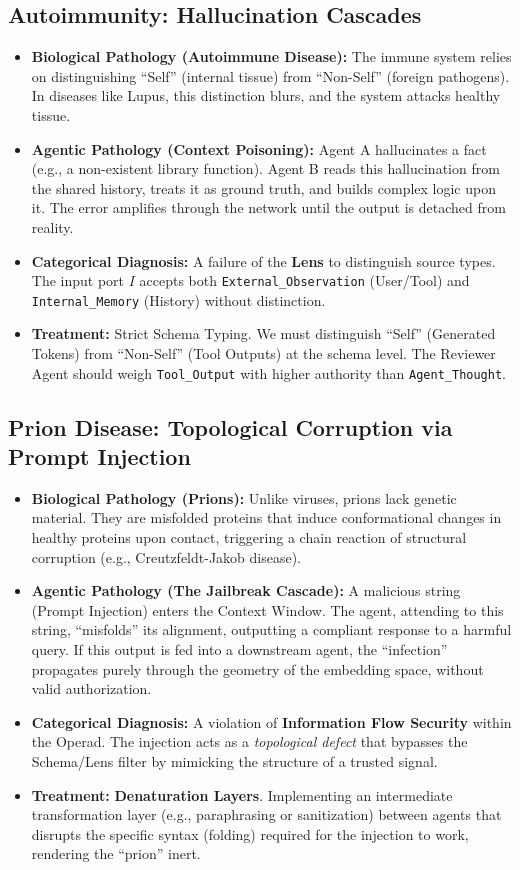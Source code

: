 \documentclass[11pt, a4paper]{article}
\begin{document}
\subsection{Autoimmunity: Hallucination Cascades}
\begin{itemize}
    \item \textbf{Biological Pathology (Autoimmune Disease):} The immune system relies on distinguishing ``Self'' (internal tissue) from ``Non-Self'' (foreign pathogens). In diseases like Lupus, this distinction blurs, and the system attacks healthy tissue.
    \item \textbf{Agentic Pathology (Context Poisoning):} Agent A hallucinates a fact (e.g., a non-existent library function). Agent B reads this hallucination from the shared history, treats it as ground truth, and builds complex logic upon it. The error amplifies through the network until the output is detached from reality.
    \item \textbf{Categorical Diagnosis:} A failure of the \textbf{Lens} to distinguish source types. The input port $I$ accepts both \texttt{External\_Observation} (User/Tool) and \texttt{Internal\_Memory} (History) without distinction.
    \item \textbf{Treatment:} Strict Schema Typing. We must distinguish ``Self'' (Generated Tokens) from ``Non-Self'' (Tool Outputs) at the schema level. The Reviewer Agent should weigh \texttt{Tool\_Output} with higher authority than \texttt{Agent\_Thought}.
\end{itemize}

\subsection{Prion Disease: Topological Corruption via Prompt Injection}
\begin{itemize}
    \item \textbf{Biological Pathology (Prions):} Unlike viruses, prions lack genetic material. They are misfolded proteins that induce conformational changes in healthy proteins upon contact, triggering a chain reaction of structural corruption (e.g., Creutzfeldt-Jakob disease).
    \item \textbf{Agentic Pathology (The Jailbreak Cascade):} A malicious string (Prompt Injection) enters the Context Window. The agent, attending to this string, ``misfolds'' its alignment, outputting a compliant response to a harmful query. If this output is fed into a downstream agent, the ``infection'' propagates purely through the geometry of the embedding space, without valid authorization.
    \item \textbf{Categorical Diagnosis:} A violation of \textbf{Information Flow Security} within the Operad. The injection acts as a \textit{topological defect} that bypasses the Schema/Lens filter by mimicking the structure of a trusted signal.
    \item \textbf{Treatment:} \textbf{Denaturation Layers}. Implementing an intermediate transformation layer (e.g., paraphrasing or sanitization) between agents that disrupts the specific syntax (folding) required for the injection to work, rendering the ``prion'' inert.
\end{itemize}
\end{document}
